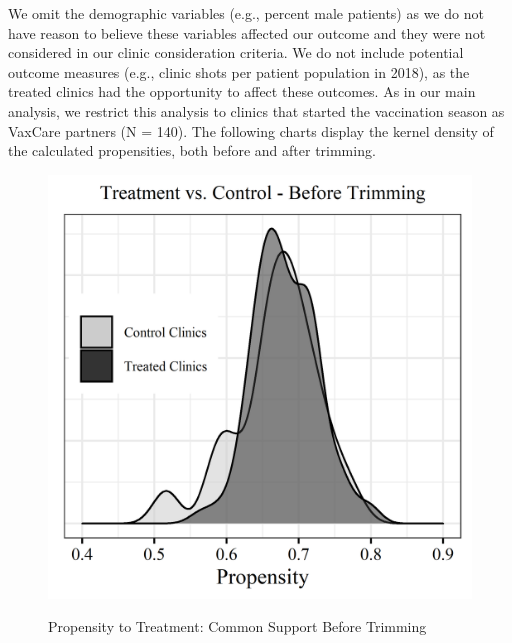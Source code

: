 We omit the demographic variables (e.g., percent male patients) as we do not have reason to believe these variables affected our outcome and they were not considered in our clinic consideration criteria. We do not include potential outcome measures (e.g., clinic shots per patient population in 2018), as the treated clinics had the opportunity to affect these outcomes. As in our main analysis, we restrict this analysis to clinics that started the vaccination season as VaxCare partners (N = 140). The following charts display the kernel density of the calculated propensities, both before and after trimming.

 \begin{figure}
     \centering
     \caption{Propensity to Treatment: Common Support Before Trimming} %
     \includegraphics[scale=1]{Figures/CC/Figure C.1 (left).png}     
     \label{fig:pre_trim}
 \end{figure}  
